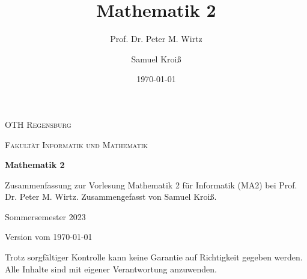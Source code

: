 \documentclass[11pt,a4paper]{article}
\title{Mathematik 2}
\author{Prof. Dr. Peter M. Wirtz \and Samuel Kroiß}
\date{\today}
\begin{document}
    \begin{titlepage}
        \centering
        {\textsc{OTH Regensburg} \par}
        {\textsc{Fakultät Informatik und Mathematik} \par}
        \vspace{4cm}
        {\Huge\bfseries 
            Mathematik 2
        \par}
        \vspace{2cm}
        {\Large
            Zusammenfassung zur Vorlesung Mathematik 2 für Informatik (MA2) bei Prof. Dr. Peter M. Wirtz.
            Zusammengefasst von Samuel Kroiß.
        \par}
        \vfill
        {\large Sommersemester 2023 \par Version vom \today\par}
        \vfill
        Trotz sorgfältiger Kontrolle kann keine Garantie auf Richtigkeit gegeben werden. Alle Inhalte sind mit eigener Verantwortung anzuwenden.
    \end{titlepage}
    \tableofcontents
    
\end{document}
